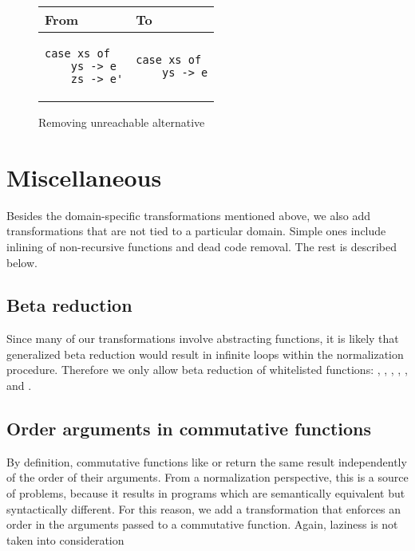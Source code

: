 \begin{figure}
\centering
\begin{tabular}{>{\centering\arraybackslash}m{8em} | >{\centering\arraybackslash}m{8em} }
From & To \\
\hline
\begin{verbatim}
case xs of
    ys -> e
    zs -> e'
\end{verbatim}
& \begin{verbatim}
case xs of
    ys -> e
\end{verbatim}
\end{tabular}
\caption{Removing unreachable alternative}
\label{fig:patterns-remove-unreachable-alt}
\end{figure}

\section{Miscellaneous}

Besides the domain-specific transformations mentioned above, we also add transformations that are not tied to a particular domain. Simple ones include inlining of non-recursive functions and dead code removal. The rest is described below.

\subsection{Beta reduction}

Since many of our transformations involve abstracting functions, it is likely that generalized beta reduction would result in infinite loops within the normalization procedure. Therefore we only allow beta reduction of whitelisted functions: , , \haskell{++}, , ,  and .

\subsection{Order arguments in commutative functions}

By definition, commutative functions like \haskell{(+)} or \haskell{(*)} return the same result independently of the order of their arguments. From a normalization perspective, this is a source of problems, because it results in programs which are semantically equivalent but syntactically different. For this reason, we add a transformation that enforces an order in the arguments passed to a commutative function. Again, laziness is not taken into consideration

